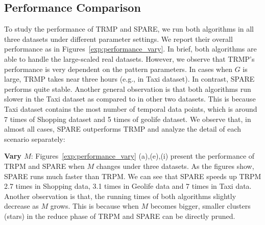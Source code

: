 \subsection{Performance Comparison}
%
To study the performance of TRMP and SPARE, we run both algorithms 
in all three datasets under different parameter settings. We report
their overall performance as in Figures~\ref{exp:performance_vary}.
In brief, both algorithms are able to handle the large-scaled real
datasets. However, we observe that TRMP's performance is very
dependent on the pattern parameters.
In cases when $G$ is large, TRMP takes near three hours (e.g., in Taxi dataset).
In contrast, SPARE performs quite stable. Another general observation
is that both algorithms run slower in the Taxi dataset as compared to in
other two datasets. This is because Taxi dataset contains
the most number of temporal data points, which is around 7 times of Shopping
dataset and 5 times of geolife dataset. We observe that, 
in almost all cases, SPARE outperforms TRMP and analyze the detail
of each scenario separately:

\textbf{Vary $M$}: Figures~\ref{exp:performance_vary} (a),(e),(i)
present the performance of TRPM and SPARE when $M$ changes under three datasets.
As the figures show, SPARE runs much faster than TRPM. We can see that SPARE
speeds up TRPM 2.7 times in Shopping data, 3.1 times in Geolife data and
7 times in Taxi data. Another observation is that, the running times
of both algorithms slightly decrease as $M$ grows. This is
because when $M$ becomes bigger, smaller clusters (stars) in 
the reduce phase of TRPM and SPARE can be directly pruned.

